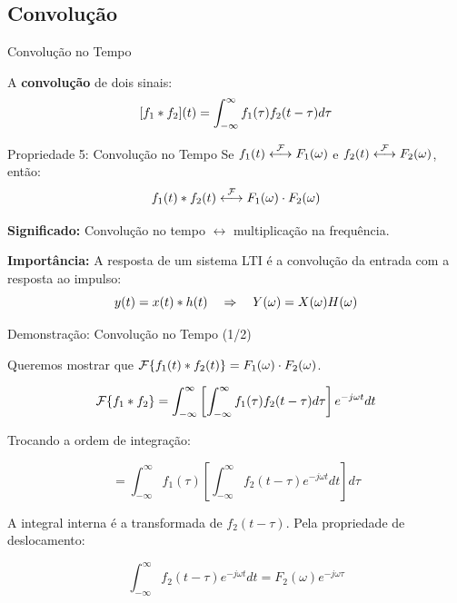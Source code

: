 
\subsection{Convolução}

\begin{frame}{Convolução no Tempo}

A \textbf{convolução} de dois sinais:
\[
[f_1 \ast f_2](t) = \int_{-\infty}^{\infty} f_1(\tau) f_2(t - \tau) d\tau
\]

\begin{block}{Propriedade 5: Convolução no Tempo}
Se $f_1(t) \mathrel{\overset{\mathcal{F}}{\longleftrightarrow}} F_1(\omega)$ e $f_2(t) \mathrel{\overset{\mathcal{F}}{\longleftrightarrow}} F_2(\omega)$, então:
\[
f_1(t) \ast f_2(t) \mathrel{\overset{\mathcal{F}}{\longleftrightarrow}} F_1(\omega) \cdot F_2(\omega)
\]
\end{block}

\textbf{Significado:} Convolução no tempo $\leftrightarrow$ multiplicação na frequência.

\textbf{Importância:} A resposta de um sistema LTI é a convolução da entrada com a resposta ao impulso:
\[
y(t) = x(t) \ast h(t) \quad \Rightarrow \quad Y(\omega) = X(\omega) H(\omega)
\]

\end{frame}


\begin{frame}{Demonstração: Convolução no Tempo (1/2)}

Queremos mostrar que $\mathcal{F}\{f_1(t) \ast f_2(t)\} = F_1(\omega) \cdot F_2(\omega)$.

\[
\mathcal{F}\{f_1 \ast f_2\} = \int_{-\infty}^{\infty} \left[\int_{-\infty}^{\infty} f_1(\tau) f_2(t - \tau) d\tau\right] e^{-j\omega t} dt
\]

Trocando a ordem de integração:

\[
= \int_{-\infty}^{\infty} f_1(\tau) \left[\int_{-\infty}^{\infty} f_2(t - \tau) e^{-j\omega t} dt\right] d\tau
\]

A integral interna é a transformada de $f_2(t - \tau)$. Pela propriedade de deslocamento:

\[
\int_{-\infty}^{\infty} f_2(t - \tau) e^{-j\omega t} dt = F_2(\omega) e^{-j\omega\tau}
\]

\end{frame}


